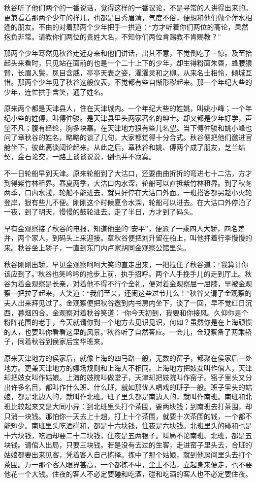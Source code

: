 \documentclass[12pt,UTF8]{ctexbook}
\begin{document}
{{{秋谷听了他们两个的一番说话，觉得这样的一番议论，不是寻常的人讲得出来的。更兼看着那两个少年的样儿，也都是目秀眉清，气度不俗，便想和他们做个萍水相逢的朋友。不由的对着那两个少年把手一拱道：“方才听着你们两位的高论，果然抱负非常。请教你们两位的贵姓大名，不知你们两位肯赐教不肯赐教？”

那两个少年蓦然见秋谷走近身来和他们讲话，出其不意，不觉倒吃了一惊。及至抬起头来看时，只见站在面前的也是一个二十上下的少年，却生得粉面朱唇，蜂腰猿臂，长眉入鬓，凤目含威，亭亭天表之姿，濯濯灵和之柳。从来名士相怜，倾城互惜。那两个少年见了秋谷这般仪表，不觉都有些自惭形秽起来。那一个年纪大些的少年，连忙拱手含笑，通了姓名。

原来两个都是天津县人，住在天津城内。一个年纪大些的姓姚，叫姚小峰；一个年纪小些的姓傅，叫傅仲骏。是天津县里头两家著名的绅士。却又都是少年好学，声望不凡；腹有经纶，胸多块磊。在天津地方狠有些儿名望。当下傅仲骏和姚小峰也问了章秋谷的姓名，略略的谈了几句，大家都觉得十分合式。秋谷便把他们邀进官舱坐下，彼此高谈阔论起来。从此之后，章秋谷和姚、傅两个成了朋友，芝兰结契，金石论交，一路上谈谈说说，倒也并不寂寞。

不一日轮船早到天津。原来轮船到了大沽口，还要曲曲折折的弯进七十二沽，方才到得紫竹林租界。春夏两季，大沽口内水深，轮船可以直抵紫竹林租界。到了秋冬两季，口内水浅，轮船不能进去，就只好停在大沽口外面。一班搭客都另趁小火轮登岸，狠有些儿不便。刚刚这个时候夏令水深，轮船可以进去。在大沽口外停泊了一夜，到了明天，慢慢的鼓轮进去。走了半日，方才到了码头。

早有金观察接了秋谷的电报，知道他坐的“安平”，便派了一乘四人大轿，四名差弁，两个家人，到码头上来迎接。章秋谷便把刘升留在船上，叫他押着行李慢慢的来。秋谷坐上轿子，一直到东门内卢家胡同金观察公馆里头。

秋谷刚刚出轿，早见金观察呵呵大笑的直走出来，一把拉住了秋谷道：“我算计你该应到了。”秋谷也笑吟吟的抢步上前，执手招呼。两个人手挽手儿的走到厅上。秋谷为着金观察是长亲，对着他不得不行个全礼，便对着金观察屈一屈膝，早被金观察一把拉了起来，大笑道：“我们至亲，还闹这些过节儿么！”秋谷又请了金观察的夫人出来拜见过了。金观察便把秋谷邀到内书房内坐下，谈了一回，早不觉红日沉西，暮烟四合。金观察对着秋谷笑道：“你今天初到，我要和你接风。久仰你是个粉阵花围的老手，今天就请你到一个地方去见识见识，何如？虽然你是在上海顽惯的人，也要叫你看看这里的风景。”秋谷听了自然答应。一会儿，金观察备了两乘轿子，同着秋谷到侯家后宝华班来。

原来天津地方的侯家后，就像上海的四马路一般，无数的窑子，都聚在侯家后一处地方。更兼天津地方的嫖场规则和上海大不相同。上海地方把妓女叫作倌人，天津却把妓女叫作姑娘。上海的妓院叫做堂子，天津却把妓院叫作窑子。窑子里头又分出许多名目，都叫作什么班、什么班，就如那优人唱戏的班子一般。班子里头的姑娘，都是北边人的，就叫作北班。班子里头都是南边人的，就叫作南班。南班和北班比较起来又是大同小异：到北班里头打个茶围，要两块钱；到南班去打茶围，却只消一块钱。那怕你一天去上十趟，打上十个茶围，就要十次茶围的钱，一个都不能短少。南班里头吃酒碰和，都是十六块钱，住夜是六块钱。北班里头的碰和也是十六块钱，吃酒却要二十二块钱，住夜是五两银子。叫局不论南班、北班，都是五块钱。请倌人出局，只要三块钱。若是没有去过的生客，走进窑子里头去，合班的姑娘都要出来见客，凭着客人自己拣择。拣中了那个姑娘，就到他房间里头去打个茶围。万一那个客人眼界甚高，一个都拣不中，尘土不沾，立起身来便走，也不要他花一个大钱。住夜的客人不必定要碰和吃酒，碰和吃酒的客人也不必定要住夜。

}}}
\end{document}
